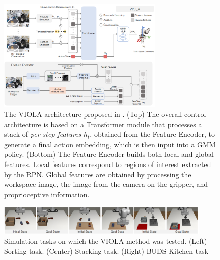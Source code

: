 \begin{figure}[t]
    \centering
    \includegraphics[width=0.7\textwidth]{figures/images/viola/viola_architecture.png}
        \caption{The VIOLA architecture proposed in \cite{zhu2023viola}. (Top) The overall control architecture is based on a Transformer module that processes a stack of \textit{per-step features} $h_{t}$, obtained from the Feature Encoder, to generate a final action embedding, which is then input into a GMM policy. (Bottom) The Feature Encoder builds both local and global features. Local features correspond to regions of interest extracted by the RPN. Global features are obtained by processing the workspace image, the image from the camera on the gripper, and proprioceptive information.
        }
    \label{fig:viola_architecture}
    
\end{figure}

\begin{figure}[t]
    \centering
    \includegraphics[width=0.9\textwidth]{figures/images/viola/viola_task.png}
    \caption{Simulation tasks on which the VIOLA \cite{zhu2023viola} method was tested. (Left) Sorting task. (Center) Stacking task. (Right) BUDS-Kitchen task}
    \label{fig:viola_task}
    
\end{figure}
